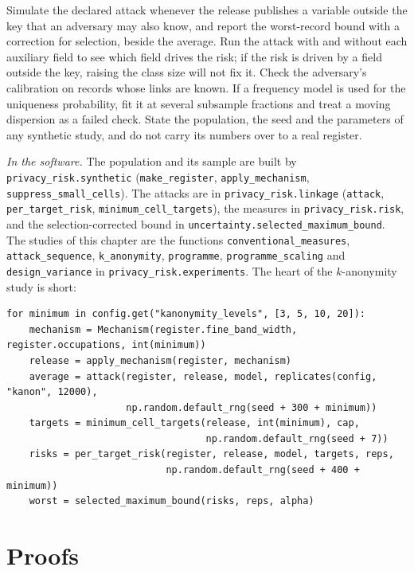 \begin{inpractice}
Simulate the declared attack whenever the release publishes a variable outside the
key that an adversary may also know, and report the worst-record bound with a
correction for selection, beside the average. Run the attack with and without each
auxiliary field to see which field drives the risk; if the risk is driven by a field
outside the key, raising the class size will not fix it. Check the adversary's
calibration on records whose links are known. If a frequency model is used for the
uniqueness probability, fit it at several subsample fractions and treat a moving
dispersion as a failed check. State the population, the seed and the parameters of
any synthetic study, and do not carry its numbers over to a real register.

\sloppy\smallskip\noindent\textit{In the software.} The population and its sample are built
by \texttt{privacy\_risk.synthetic} (\texttt{make\_register},
\texttt{apply\_mechanism}, \texttt{suppress\_small\_cells}). The attacks are in
\texttt{privacy\_risk.linkage} (\texttt{attack}, \texttt{per\_target\_risk},
\texttt{minimum\_cell\_targets}), the measures in \texttt{privacy\_risk.risk}, and the
selection-corrected bound in \texttt{uncertainty.selected\_maximum\_bound}. The
studies of this chapter are the functions \texttt{conventional\_measures},
\texttt{attack\_sequence}, \texttt{k\_anonymity}, \texttt{programme},
\texttt{programme\_scaling} and \texttt{design\_variance} in
\texttt{privacy\_risk.experiments}. The heart of the $k$-anonymity study is short:
\begin{lstlisting}
for minimum in config.get("kanonymity_levels", [3, 5, 10, 20]):
    mechanism = Mechanism(register.fine_band_width, register.occupations, int(minimum))
    release = apply_mechanism(register, mechanism)
    average = attack(register, release, model, replicates(config, "kanon", 12000),
                     np.random.default_rng(seed + 300 + minimum))
    targets = minimum_cell_targets(release, int(minimum), cap,
                                   np.random.default_rng(seed + 7))
    risks = per_target_risk(register, release, model, targets, reps,
                            np.random.default_rng(seed + 400 + minimum))
    worst = selected_maximum_bound(risks, reps, alpha)
\end{lstlisting}
\end{inpractice}

\section{Proofs}

